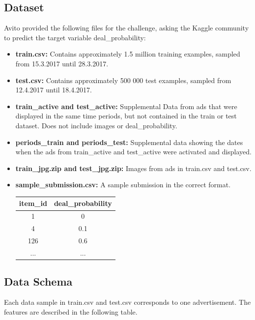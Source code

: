 \documentclass[runningheads]{llncs}
\begin{document}
\subsection{Dataset}
Avito provided the following files for the challenge, asking the Kaggle community to predict the target variable deal\_probability:
\begin{itemize}
	\item \textbf{train.csv:} Contains approximately 1.5 million training examples, sampled from 15.3.2017 until 28.3.2017.
	\item \textbf{test.csv:} Contains approximately 500 000 test examples, sampled from 12.4.2017 until 18.4.2017.
	\item \textbf{train\_active and test\_active:} Supplemental Data from ads that were displayed in the same time periods, but not contained in the train or test dataset. Does not include images or deal\_probability.
	\item \textbf{periods\_train and periods\_test:} Supplemental data showing the dates when the ads from train\_active and test\_active were activated and displayed.
	\item \textbf{train\_jpg.zip and test\_jpg.zip:} Images from ads in train.csv and test.csv.
	\item \textbf{sample\_submission.csv:} A sample submission in the correct format.\\
	\begin{center}
	\begin{tabular}{|c|c|}
		\hline 
		\textbf{item\_id} & \textbf{deal\_probability} \\ 
		\hline 
		1 & 0 \\ 
		\hline 
		4 & 0.1 \\ 
		\hline 
		126 & 0.6 \\ 
		\hline 
		... & ... \\ 
		\hline 
	\end{tabular} 
	\end{center} 
\end{itemize}

\subsection{Data Schema}  

Each data sample in train.csv and test.csv corresponds to one advertisement. The features are described in the following table. \\
\end{document}
